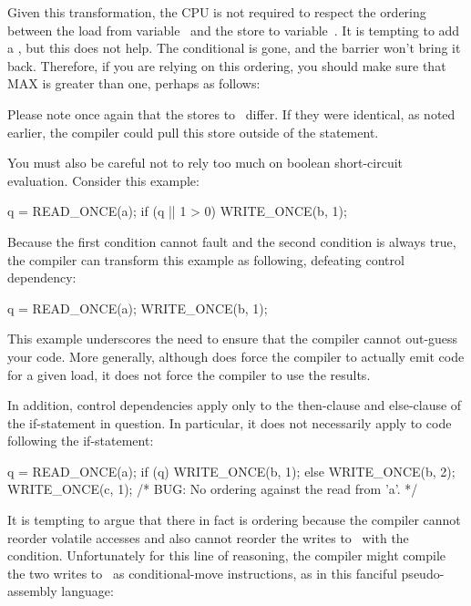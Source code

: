 Given this transformation, the CPU is not required to respect the ordering
between the load from variable~ and the store to variable~.
It is tempting to add a , but this does not help.
The conditional is gone, and the barrier won't bring it back.
Therefore, if you are relying on this ordering, you should make sure that
MAX is greater than one, perhaps as follows:


Please note once again that the stores to~ differ.
If they were identical, as noted earlier, the compiler could pull this
store outside of the  statement.

You must also be careful not to rely too much on boolean short-circuit
evaluation.
Consider this example:

\begin{VerbatimU}
	q = READ_ONCE(a);
	if (q || 1 > 0)
		WRITE_ONCE(b, 1);
\end{VerbatimU}

Because the first condition cannot fault and the second condition is
always true, the compiler can transform this example as following,
defeating control dependency:

\begin{VerbatimU}
	q = READ_ONCE(a);
	WRITE_ONCE(b, 1);
\end{VerbatimU}

This example underscores the need to ensure that the compiler cannot
out-guess your code.  More generally, although  does force
the compiler to actually emit code for a given load, it does not force
the compiler to use the results.

In addition, control dependencies apply only to the then-clause and
else-clause of the if-statement in question.
In particular, it does not necessarily apply to code following the
if-statement:

\begin{VerbatimU}
	q = READ_ONCE(a);
	if (q) {
		WRITE_ONCE(b, 1);
	} else {
		WRITE_ONCE(b, 2);
	}
	WRITE_ONCE(c, 1);  /* BUG: No ordering against the read from 'a'. */
\end{VerbatimU}

It is tempting to argue that there in fact is ordering because the
compiler cannot reorder volatile accesses and also cannot reorder
the writes to~ with the condition.
Unfortunately for this line of reasoning, the compiler might compile
the two writes to~ as conditional-move instructions, as in this
fanciful pseudo-assembly language:

